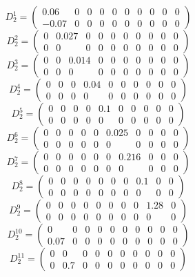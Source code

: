 \documentclass[a4paper,12pt]{article}
\begin{document}
\[
D^1_2 = \begin{pmatrix}
    0.06 & 0 & 0 & 0 & 0 & 0 & 0 & 0 & 0 & 0 \\
    -0.07 & 0 & 0 & 0 & 0 & 0 & 0 & 0 & 0 & 0
\end{pmatrix}
\]
\[
D^2_2 = \begin{pmatrix}
    0 & 0.027 & 0 & 0 & 0 & 0 & 0 & 0 & 0 & 0 \\
    0 & 0 & 0 & 0 & 0 & 0 & 0 & 0 & 0 & 0
\end{pmatrix}
\]
\[
D^3_2 = \begin{pmatrix}
    0 & 0 & 0.014 & 0 & 0 & 0 & 0 & 0 & 0 & 0 \\
    0 & 0 & 0 & 0 & 0 & 0 & 0 & 0 & 0 & 0
\end{pmatrix}
\]
\[
D^4_2 = \begin{pmatrix}
    0 & 0 & 0 & 0.04 & 0 & 0 & 0 & 0 & 0 & 0 \\
    0 & 0 & 0 & 0 & 0 & 0 & 0 & 0 & 0 & 0
\end{pmatrix}
\]
\[
D^5_2 = \begin{pmatrix}
    0 & 0 & 0 & 0 & 0.1 & 0 & 0 & 0 & 0 & 0 \\
    0 & 0 & 0 & 0 & 0 & 0 & 0 & 0 & 0 & 0
\end{pmatrix}
\]
\[
D^6_2 = \begin{pmatrix}
    0 & 0 & 0 & 0 & 0 & 0.025 & 0 & 0 & 0 & 0 \\
    0 & 0 & 0 & 0 & 0 & 0 & 0 & 0 & 0 & 0
\end{pmatrix}
\]
\[
D^7_2 = \begin{pmatrix}
    0 & 0 & 0 & 0 & 0 & 0 & 0.216 & 0 & 0 & 0 \\
    0 & 0 & 0 & 0 & 0 & 0 & 0 & 0 & 0 & 0
\end{pmatrix}
\]
\[
D^8_2 = \begin{pmatrix}
    0 & 0 & 0 & 0 & 0 & 0 & 0 & 0.1 & 0 & 0 \\
    0 & 0 & 0 & 0 & 0 & 0 & 0 & 0 & 0 & 0
\end{pmatrix}
\]
\[
D^9_2 = \begin{pmatrix}
    0 & 0 & 0 & 0 & 0 & 0 & 0 & 0 & 1.28 & 0 \\
    0 & 0 & 0 & 0 & 0 & 0 & 0 & 0 & 0 & 0
\end{pmatrix}
\]
\[
D^{10}_2 = \begin{pmatrix}
    0 & 0 & 0 & 0 & 0 & 0 & 0 & 0 & 0 & 0 \\
    0.07 & 0 & 0 & 0 & 0 & 0 & 0 & 0 & 0 & 0
\end{pmatrix}
\]
\[
D^{11}_2 = \begin{pmatrix}
    0 & 0 & 0 & 0 & 0 & 0 & 0 & 0 & 0 & 0 \\
    0 & 0.7 & 0 & 0 & 0 & 0 & 0 & 0 & 0 & 0
\end{pmatrix}
\]
\end{document}
